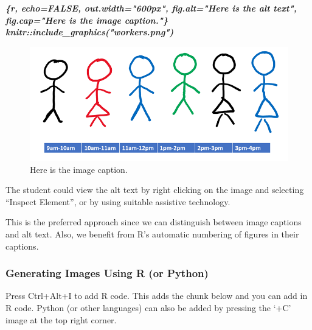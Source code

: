 \documentclass[
]{article}
\newenvironment{Shaded}{\begin{snugshade}}{\end{snugshade}}
\newcommand{\InformationTok}[1]{\textcolor[rgb]{0.56,0.35,0.01}{\textbf{\textit{#1}}}}
\numberwithin{equation}{section}
\numberwithin{figure}{section}
\theoremstyle{break}
\theoremstyle{definition}
\theoremstyle{definition}
\theoremstyle{definition}
\theoremstyle{definition}
\theoremstyle{remark}
\begin{document}
\begin{Shaded}
\begin{Highlighting}[]
\InformationTok{\textasciigrave{}\textasciigrave{}\textasciigrave{}\{r, echo=FALSE, out.width="600px", fig.alt="Here is the alt text", fig.cap="Here is the image caption."\}}
\InformationTok{    knitr::include\_graphics("workers.png")}
\InformationTok{\textasciigrave{}\textasciigrave{}\textasciigrave{}}
\end{Highlighting}
\end{Shaded}

\begin{figure}
\includegraphics[width=600px]{workers} \caption{Here is the image caption.}\label{fig:unnamed-chunk-14}
\end{figure}

The student could view the alt text by right clicking on the image and selecting ``Inspect Element'', or by using suitable assistive technology.

This is the preferred approach since we can distinguish between image captions and alt text. Also, we benefit from R's automatic numbering of figures in their captions.

\hypertarget{generating-images-using-r-or-python}{%
\subsubsection{Generating Images Using R (or Python)}\label{generating-images-using-r-or-python}}

Press Ctrl+Alt+I to add R code. This adds the chunk below and you can add in R code. Python (or other languages) can also be added by pressing the `+C' image at the top right corner.
\end{document}
